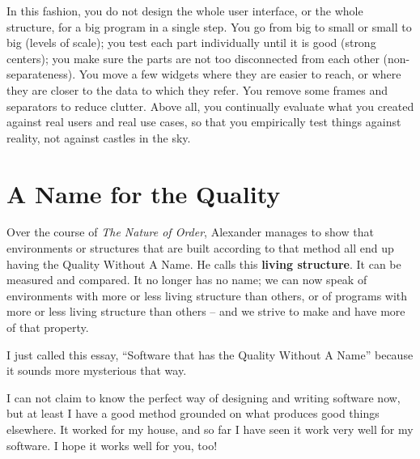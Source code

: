 In this fashion, you do not design the whole user interface, or the whole
structure, for a big program in a single step. You go from big to small or small
to big (levels of scale); you test each part individually until it is good
(strong centers); you make sure the parts are not too disconnected from each
other (non-separateness). You move a few widgets where they are easier to reach,
or where they are closer to the data to which they refer. You remove some frames
and separators to reduce clutter. Above all, you continually evaluate what you
created against real users and real use cases, so that you empirically test
things against reality, not against castles in the sky.

\section*{A Name for the Quality}

Over the course of \textit{The Nature of Order}, Alexander manages to show that
environments or structures that are built according to that method all end up
having the Quality Without A Name. He calls this \textbf{living structure}. It
can be measured and compared. It no longer has no name; we can now speak of
environments with more or less living structure than others, or of programs with
more or less living structure than others -- and we strive to make and have more of
that property.

I just called this essay, ``Software that has the Quality Without A Name'' because
it sounds more mysterious that way.

I can not claim to know the perfect way of designing and writing software now,
but at least I have a good method grounded on what produces good things
elsewhere. It worked for my house, and so far I have seen it work very well for
my software. I hope it works well for you, too!


